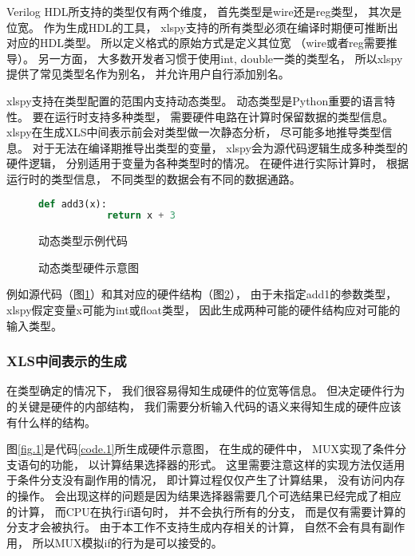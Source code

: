 Verilog HDL所支持的类型仅有两个维度，
首先类型是wire还是reg类型，
其次是位宽。
作为生成HDL的工具，
xlspy支持的所有类型必须在编译时期便可推断出对应的HDL类型。
所以定义格式的原始方式是定义其位宽
（wire或者reg需要推导）。
另一方面，
大多数开发者习惯于使用int, double一类的类型名，
所以xlspy提供了常见类型名作为别名，
并允许用户自行添加别名。

xlspy支持在类型配置的范围内支持动态类型。
动态类型是Python重要的语言特性。
要在运行时支持多种类型，
需要硬件电路在计算时保留数据的类型信息。
xlspy在生成XLS中间表示前会对类型做一次静态分析，
尽可能多地推导类型信息。
对于无法在编译期推导出类型的变量，
xlspy会为源代码逻辑生成多种类型的硬件逻辑，
分别适用于变量为各种类型时的情况。
在硬件进行实际计算时，
根据运行时的类型信息，
不同类型的数据会有不同的数据通路。

\begin{figure}[h]
    \begin{lstlisting}[language=Python,frame=single]
        def add3(x):
            return x + 3
    \end{lstlisting}
    \caption{动态类型示例代码}
    \label{code.2}
\end{figure}

\begin{figure}[h]
\centering

\caption{动态类型硬件示意图}
\label{fig.2}
\end{figure}

例如源代码（图\ref{code.2}）和其对应的硬件结构（图\ref{fig.2}），
由于未指定add1的参数类型，
xlspy假定变量x可能为int或float类型，
因此生成两种可能的硬件结构应对可能的输入类型。

\subsubsection{XLS中间表示的生成}

在类型确定的情况下，
我们很容易得知生成硬件的位宽等信息。
但决定硬件行为的关键是硬件的内部结构，
我们需要分析输入代码的语义来得知生成的硬件应该有什么样的结构。

图\ref{fig.1}是代码\ref{code.1}所生成硬件示意图，
在生成的硬件中，
MUX实现了条件分支语句的功能，
以计算结果选择器的形式。
这里需要注意这样的实现方法仅适用于条件分支没有副作用的情况，
即计算过程仅仅产生了计算结果，
没有访问内存的操作。
会出现这样的问题是因为结果选择器需要几个可选结果已经完成了相应的计算，
而CPU在执行if语句时，
并不会执行所有的分支，
而是仅有需要计算的分支才会被执行。
由于本工作不支持生成内存相关的计算，
自然不会有具有副作用，
所以MUX模拟if的行为是可以接受的。

